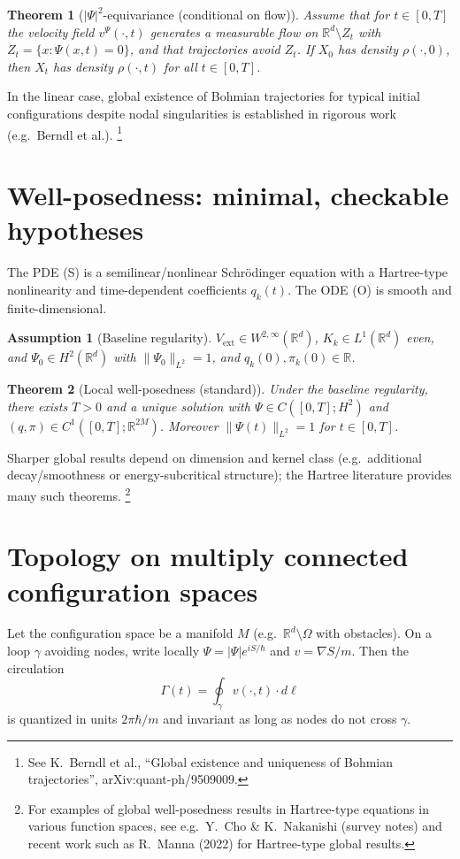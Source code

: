 \documentclass[11pt]{article}
\newtheorem{theorem}{Theorem}
\newtheorem{assumption}{Assumption}
\begin{document}
\begin{theorem}[$|\Psi|^2$-equivariance (conditional on flow)]
Assume that for $t\in[0,T]$ the velocity field $v^\Psi(\cdot,t)$ generates a measurable flow
on $\mathbb{R}^d\setminus Z_t$ with $Z_t=\{x:\Psi(x,t)=0\}$, and that trajectories avoid $Z_t$.
If $X_0$ has density $\rho(\cdot,0)$, then $X_t$ has density $\rho(\cdot,t)$ for all $t\in[0,T]$.
\end{theorem}

\noindent
In the linear case, global existence of Bohmian trajectories for typical initial configurations
despite nodal singularities is established in rigorous work (e.g.\ Berndl et al.).%
\footnote{See K.\ Berndl et al., ``Global existence and uniqueness of Bohmian trajectories'', arXiv:quant-ph/9509009.}

\section{Well-posedness: minimal, checkable hypotheses}
The PDE \textup{(S)} is a semilinear/nonlinear Schr\"odinger equation with a Hartree-type nonlinearity
and time-dependent coefficients $q_k(t)$. The ODE \textup{(O)} is smooth and finite-dimensional.

\begin{assumption}[Baseline regularity]
$V_{\mathrm{ext}}\in W^{2,\infty}(\mathbb{R}^d)$, $K_k\in L^1(\mathbb{R}^d)$ even, and
$\Psi_0\in H^2(\mathbb{R}^d)$ with $\|\Psi_0\|_{L^2}=1$, and $q_k(0),\pi_k(0)\in\mathbb{R}$.
\end{assumption}

\begin{theorem}[Local well-posedness (standard)]
Under the baseline regularity, there exists $T>0$ and a unique solution with
$\Psi\in C([0,T];H^2)$ and $(q,\pi)\in C^1([0,T];\mathbb{R}^{2M})$.
Moreover $\|\Psi(t)\|_{L^2}=1$ for $t\in[0,T]$.
\end{theorem}

\noindent
Sharper global results depend on dimension and kernel class (e.g.\ additional decay/smoothness or
energy-subcritical structure); the Hartree literature provides many such theorems.%
\footnote{For examples of global well-posedness results in Hartree-type equations in various function spaces,
see e.g.\ Y.\ Cho \& K.\ Nakanishi (survey notes) and recent work such as R.\ Manna (2022) for Hartree-type global results.}

\section{Topology on multiply connected configuration spaces}
Let the configuration space be a manifold $M$ (e.g.\ $\mathbb{R}^d\setminus\Omega$ with obstacles).
On a loop $\gamma$ avoiding nodes, write locally $\Psi=|\Psi|e^{iS/\hbar}$ and $v=\nabla S/m$.
Then the circulation
\[
\Gamma(t)=\oint_\gamma v(\cdot,t)\cdot d\ell
\]
is quantized in units $2\pi\hbar/m$ and invariant as long as nodes do not cross $\gamma$.
\end{document}
